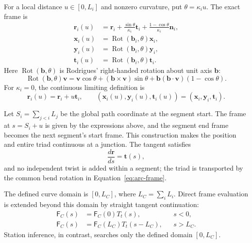 \documentclass[11pt,a4paper]{article}
\newcommand{\Frame}{\mathsf{F}}
\newcommand{\Rot}{\operatorname{Rot}}
\begin{document}
For a local distance $u\in[0,L_i]$ and nonzero curvature, put
$\theta=\kappa_i u$.  The exact frame is
\begin{align}
  \mathbf{r}_i(u)
    &=\mathbf{r}_i
      +\frac{\sin\theta}{\kappa_i}\mathbf{t}_i
      +\frac{1-\cos\theta}{\kappa_i}\mathbf{n}_i,
      \label{eq:arc-position}\\
  \mathbf{x}_i(u)&=\Rot(\mathbf{b}_i,\theta)\mathbf{x}_i,\\
  \mathbf{y}_i(u)&=\Rot(\mathbf{b}_i,\theta)\mathbf{y}_i,\\
  \mathbf{t}_i(u)&=\Rot(\mathbf{b}_i,\theta)\mathbf{t}_i.
  \label{eq:arc-frame}
\end{align}
Here $\Rot(\mathbf{b},\theta)$ is Rodrigues' right-handed rotation about unit
axis $\mathbf{b}$:
\begin{equation}
 \Rot(\mathbf{b},\theta)\mathbf{v}
 =\mathbf{v}\cos\theta
  +(\mathbf{b}\times\mathbf{v})\sin\theta
  +\mathbf{b}(\mathbf{b}\cdot\mathbf{v})(1-\cos\theta).
\end{equation}
For $\kappa_i=0$, the continuous limiting definition is
\begin{equation}
  \mathbf{r}_i(u)=\mathbf{r}_i+u\mathbf{t}_i,
  \qquad
  (\mathbf{x}_i(u),\mathbf{y}_i(u),\mathbf{t}_i(u))
  =(\mathbf{x}_i,\mathbf{y}_i,\mathbf{t}_i).
  \label{eq:straight-segment}
\end{equation}

Let $S_i=\sum_{j<i}L_j$ be the global path coordinate at the segment start.
The frame at $s=S_i+u$ is given by the expressions above, and the segment end
frame becomes the next segment's start frame.  This construction makes the
position and entire triad continuous at a junction.  The tangent satisfies
\begin{equation}
  \frac{d\mathbf{r}}{ds}=\mathbf{t}(s),
\end{equation}
and no independent twist is added within a segment; the triad is transported by
the common bend rotation in Equation~\eqref{eq:arc-frame}.

The defined curve domain is $[0,L_C]$, where $L_C=\sum_iL_i$.  Direct frame
evaluation is extended beyond this domain by straight tangent continuation:
\begin{align}
  \Frame_C(s)&=\Frame_C(0)T_t(s), &&s<0,\\
  \Frame_C(s)&=\Frame_C(L_C)T_t(s-L_C), &&s>L_C.
  \label{eq:curve-extrapolation}
\end{align}
Station inference, in contrast, searches only the defined domain
$[0,L_C]$.
\end{document}

